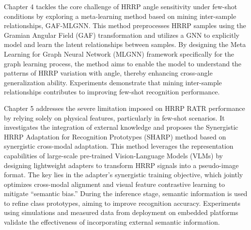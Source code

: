 \begin{eabstract}
Chapter 4 tackles the core challenge of HRRP angle sensitivity under few-shot conditions by exploring a meta-learning method based on mining inter-sample relationships, GAF-MLGNN. This method preprocesses HRRP samples using the Gramian Angular Field (GAF) transformation and utilizes a GNN to explicitly model and learn the latent relationships between samples. By designing the Meta Learning for Graph Neural Network (MLGNN) framework specifically for the graph learning process, the method aims to enable the model to understand the patterns of HRRP variation with angle, thereby enhancing cross-angle generalization ability. Experiments demonstrate that mining inter-sample relationships contributes to improving few-shot recognition performance.

Chapter 5 addresses the severe limitation imposed on HRRP RATR performance by relying solely on physical features, particularly in few-shot scenarios. It investigates the integration of external knowledge and proposes the Synergistic HRRP Adaptation for Recognition Prototypes (SHARP) method based on synergistic cross-modal adaptation. This method leverages the representation capabilities of large-scale pre-trained Vision-Language Models (VLMs) by designing lightweight adapters to transform HRRP signals into a pseudo-image format. The key lies in the adapter's synergistic training objective, which jointly optimizes cross-modal alignment and visual feature contrastive learning to mitigate ``semantic bias.'' During the inference stage, semantic information is used to refine class prototypes, aiming to improve recognition accuracy. Experiments using simulations and measured data from deployment on embedded platforms validate the effectiveness of incorporating external semantic information.
\end{eabstract}

